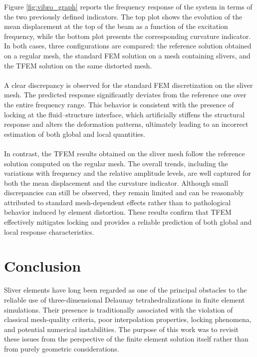 \documentclass{article}
\begin{document}
Figure \ref{fig:vibro_graph} reports the frequency response of the system in terms of the two previously defined indicators. The top plot shows the evolution of the mean displacement at the top of the beam as a function of the excitation frequency, while the bottom plot presents the corresponding curvature indicator. In both cases, three configurations are compared: the reference solution obtained on a regular mesh, the standard FEM solution on a mesh containing slivers, and the TFEM solution on the same distorted mesh.\\
\\
A clear discrepancy is observed for the standard FEM discretization on the sliver mesh. The predicted response significantly deviates from the reference one over the entire frequency range. This behavior is consistent with the presence of locking at the fluid–structure interface, which artificially stiffens the structural response and alters the deformation patterns, ultimately leading to an incorrect estimation of both global and local quantities.\\
\\
In contrast, the TFEM results obtained on the sliver mesh follow the reference solution computed on the regular mesh. The overall trends, including the variations with frequency and the relative amplitude levels, are well captured for both the mean displacement and the curvature indicator. Although small discrepancies can still be observed, they remain limited and can be reasonably attributed to standard mesh-dependent effects rather than to pathological behavior induced by element distortion. These results confirm that TFEM effectively mitigates locking and provides a reliable prediction of both global and local response characteristics.

\section{Conclusion}

Sliver elements have long been regarded as one of the principal obstacles to the reliable use of three-dimensional Delaunay tetrahedralizations in finite element simulations. Their presence is traditionally associated with the violation of classical mesh-quality criteria, poor interpolation properties, locking phenomena, and potential numerical instabilities. The purpose of this work was to revisit these issues from the perspective of the finite element solution itself rather than from purely geometric considerations.
\end{document}
